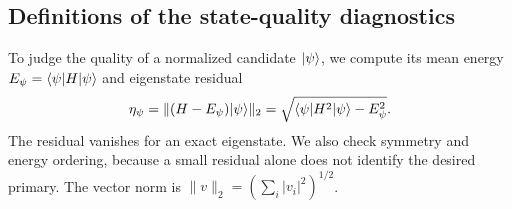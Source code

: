 \subsection{Definitions of the state-quality diagnostics}
\label{sec:validation-metrics}
To judge the quality of a normalized candidate $\lvert \psi\rangle$, we compute
its mean energy $E_\psi=\langle \psi\rvert H\lvert \psi\rangle$ and eigenstate residual
\begin{equation}
 \eta_\psi=\|(H-E_\psi)\lvert \psi\rangle\|_2
 =\sqrt{\langle \psi\rvert H^2\lvert \psi\rangle-E_\psi^2}.
 \label{eq:eigenresidual}
\end{equation}
The residual vanishes for an exact eigenstate. We also check symmetry and energy
ordering, because a small residual alone does not identify the desired
primary. The vector norm is $\|v\|_2=(\sum_i|v_i|^2)^{1/2}$.
